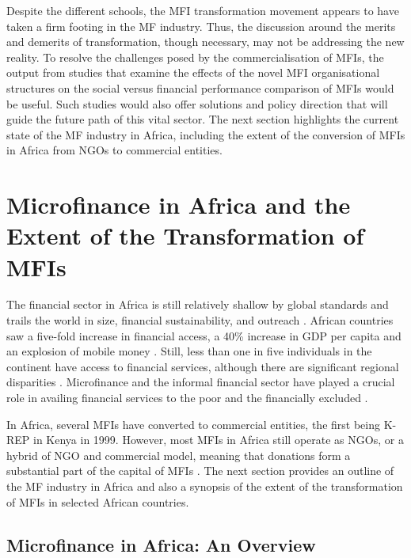 \documentclass[a4paper, nobind]{templates/ociamthesis}
\begin{document}
Despite the different schools, the MFI transformation movement appears to have taken a firm footing in the MF industry. Thus, the discussion around the merits and demerits of transformation, though necessary, may not be addressing the new reality. To resolve the challenges posed by the commercialisation of MFIs, the output from studies that examine the effects of the novel MFI organisational structures on the social versus financial performance comparison of MFIs would be useful. Such studies would also offer solutions and policy direction that will guide the future path of this vital sector. The next section highlights the current state of the MF industry in Africa, including the extent of the conversion of MFIs in Africa from NGOs to commercial entities.

\hypertarget{microfinance-in-africa-and-the-extent-of-the-transformation-of-mfis}{%
\section{Microfinance in Africa and the Extent of the Transformation of MFIs}\label{microfinance-in-africa-and-the-extent-of-the-transformation-of-mfis}}

\noindent The financial sector in Africa is still relatively shallow by global standards and trails the world in size, financial sustainability, and outreach \autocite{azad2016african}. African countries saw a five-fold increase in financial access, a 40\% increase in GDP per capita and an explosion of mobile money \autocite{klapper2015role,beck2014sme}. Still, less than one in five individuals in the continent have access to financial services, although there are significant regional disparities \autocites{data2016access}[@][]{beck2014sme}. Microfinance and the informal financial sector have played a crucial role in availing financial services to the poor and the financially excluded \autocite{klapper2015role,engstrom2017financial}.

In Africa, several MFIs have converted to commercial entities, the first being K-REP in Kenya in 1999. However, most MFIs in Africa still operate as NGOs, or a hybrid of NGO and commercial model, meaning that donations form a substantial part of the capital of MFIs \autocite{bayai2016financing}. The next section provides an outline of the MF industry in Africa and also a synopsis of the extent of the transformation of MFIs in selected African countries.

\hypertarget{microfinance-in-africa-an-overview}{%
\subsection{Microfinance in Africa: An Overview}\label{microfinance-in-africa-an-overview}}
\end{document}
